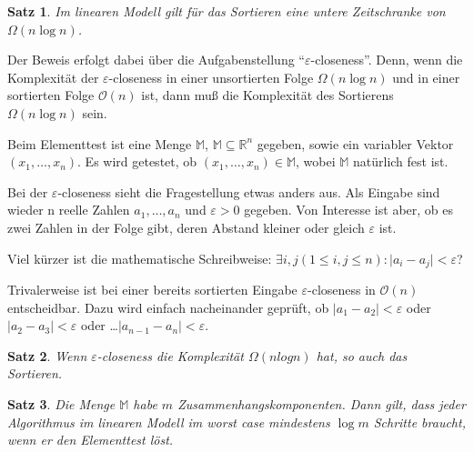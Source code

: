 \documentclass[ngerman,draft,parskip=half*,twoside]{scrreprt}
\theoremstyle{break}
\newtheorem{satz}{Satz}[chapter]
\theoremstyle{nonumberbreak}
\newcommand*{\OO}{\mathcal{O}}      %
\newcommand*{\M}{\mathbb{M}}
\newcommand*{\R}{\mathbb{R}}        %
\begin{document}
\begin{satz}
Im linearen Modell gilt für das Sortieren eine untere Zeitschranke von $ \Omega (n \log n) $.
\end{satz}
		
Der Beweis erfolgt dabei über die Aufgabenstellung "`$\varepsilon$-closeness"'. Denn, wenn die Komplexität der $\varepsilon$-closeness
in einer unsortierten Folge $\Omega(n\log n)$ und in einer sortierten Folge $\OO(n)$ ist, dann muß die Komplexität des
Sortierens $\Omega (n \log n)$ sein.
		
Beim Elementtest ist eine Menge $ \M $, $ \M \subseteq \R^n$ gegeben, sowie ein variabler Vektor $
(x_1, \dots , x_n) $. Es wird getestet, ob $ (x_1, \dots , x_n) \in \M $, wobei $ \M $ natürlich fest ist. 
	
Bei der $\varepsilon$-closeness sieht die Fragestellung etwas anders aus. Als Eingabe sind wieder n reelle Zahlen $a_1, \dots , a_n $
und $ \varepsilon > 0 $ gegeben. Von Interesse ist aber, ob es zwei Zahlen in der Folge gibt, deren Abstand kleiner oder gleich
$\varepsilon$ ist.

Viel kürzer ist die mathematische Schreibweise: $ \exists   i,  j (1 \leq i, j \leq n):\vert a_i - a_j \vert < \varepsilon $?

Trivalerweise ist bei einer bereits sortierten Eingabe $\varepsilon$-closeness in $\OO(n)$ entscheidbar. Dazu wird einfach nacheinander
geprüft, ob $ \vert a_1 - a_2 \vert < \varepsilon $ oder $ \vert a_2 - a_3 \vert < \varepsilon $ oder \dots $ \vert a_{n-1} -
a_n \vert < \varepsilon $.

\begin{satz} 
Wenn $\varepsilon$-closeness die Komplexität $\Omega (n  log  n)$ hat, so auch das Sortieren.
\end{satz}		
		
\begin{satz}
Die Menge  $ \M  $ habe $m$ Zusammenhangskomponenten. Dann gilt, dass jeder Algorithmus im linearen Modell im worst case
mindestens $ \log m $ Schritte braucht, wenn er den Elementtest löst.
\end{satz}
		 	
\end{document}
